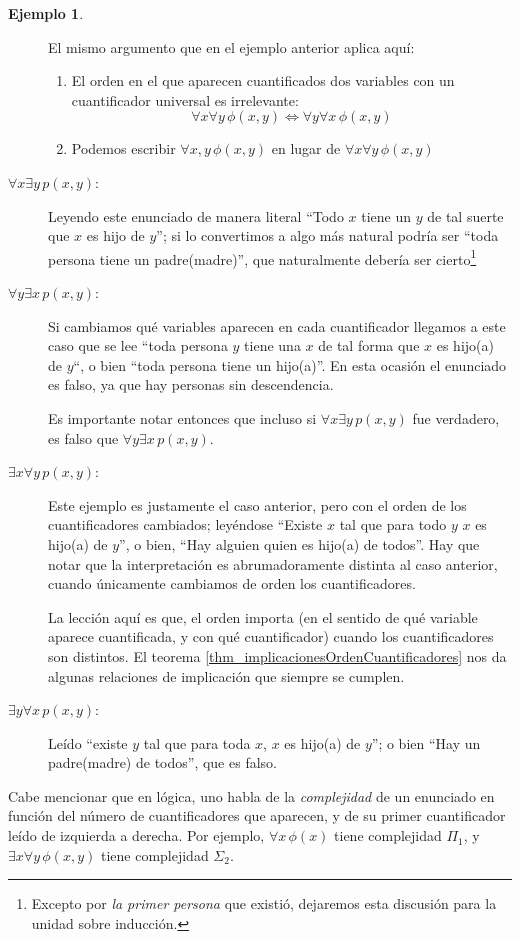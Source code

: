 \documentclass{book}
\theoremstyle{definition}
\newtheorem{ejm}{Ejemplo}[chapter]
\begin{document}
\begin{ejm}
\begin{description}
	El mismo argumento que en el ejemplo anterior aplica aquí: 
	\begin{enumerate}
		\item El orden en el que aparecen cuantificados dos variables con un cuantificador universal es irrelevante:
		\[\forall x \forall y\, \phi(x,y) \iff \forall y \forall x\, \phi(x,y) \]
		\item Podemos escribir $\forall x,y\, \phi(x,y)$ en lugar de $\forall x \forall y\, \phi(x,y)$
	\end{enumerate}
	
	\item[$\forall x \exists y\, p(x,y)$:] Leyendo este enunciado de manera literal ``Todo $x$ tiene un $y$ de tal suerte que $x$ es hijo de $y$''; si lo convertimos a algo más natural podría ser ``toda persona tiene un padre(madre)'', que naturalmente debería ser cierto\footnote{Excepto por \emph{la primer persona} que existió, dejaremos esta discusión para la unidad sobre inducción.} %
	
	\item[$\forall y \exists x\, p(x,y)$:] Si cambiamos qué variables aparecen en cada cuantificador llegamos a este caso que se lee ``toda persona $y$ tiene una $x$ de tal forma que $x$ es hijo(a) de $y$``, o bien ``toda persona tiene un hijo(a)''.
	En esta ocasión el enunciado es falso, ya que hay personas sin descendencia.
	
	Es importante notar entonces que incluso si $\forall x \exists y\, p(x,y)$ fue verdadero, es falso que $\forall y \exists x\, p(x,y)$.
	
	\item[$\exists x \forall y \, p(x,y)$:]Este ejemplo es justamente el caso anterior, pero con el orden de los cuantificadores cambiados; leyéndose ``Existe $x$ tal que para todo $y$ $x$ es hijo(a) de $y$'', o bien, ``Hay alguien quien es hijo(a) de todos''.
	Hay que notar que la interpretación es abrumadoramente distinta al caso anterior, cuando únicamente cambiamos de orden los cuantificadores.
	
	La lección aquí es que, el orden importa (en el sentido de qué variable aparece cuantificada, y con qué cuantificador) cuando los cuantificadores son distintos.
	El teorema \ref{thm_implicacionesOrdenCuantificadores} nos da algunas relaciones de implicación que siempre se cumplen.
	
	\item[$\exists y \forall x\, p(x,y)$:] Leído ``existe $y$ tal que para toda $x$, $x$ es hijo(a) de $y$''; o bien ``Hay un padre(madre) de todos'', que es falso.
	\end{description}
\end{ejm}
Cabe mencionar que en lógica, uno habla de la \emph{complejidad} de un enunciado en función del número de cuantificadores que aparecen, y de su primer cuantificador leído de izquierda a derecha. 
Por ejemplo, $\forall x\,\phi(x)$ tiene complejidad $\Pi_1$, y $\exists x \forall y\, \phi(x,y)$ tiene complejidad $\Sigma_2$.
\end{document}
